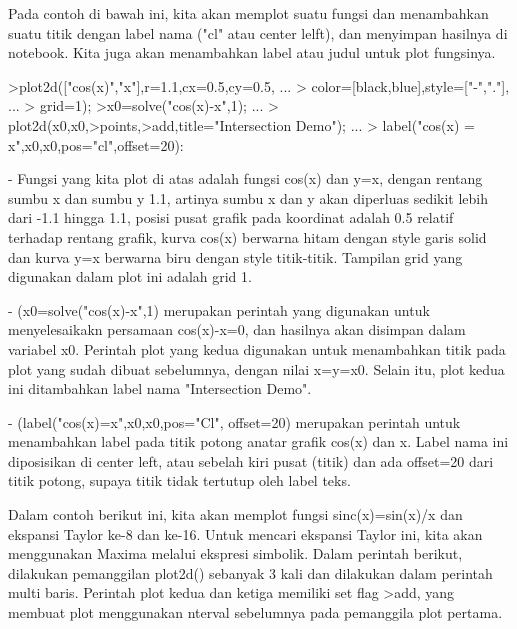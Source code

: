 \documentclass[a4paper,10pt]{article}
\begin{document}
\begin{eulernotebook}
\begin{eulercomment}
\begin{eulercomment}
\begin{eulercomment}
\begin{eulercomment}
\begin{eulercomment}
\begin{eulercomment}
\begin{eulercomment}
Pada contoh di bawah ini, kita akan memplot suatu fungsi dan
menambahkan suatu titik dengan label nama ("cl" atau center lelft),
dan menyimpan hasilnya di notebook. Kita juga akan menambahkan label
atau judul untuk plot fungsinya.
\end{eulercomment}
\begin{eulerprompt}
>plot2d(["cos(x)","x"],r=1.1,cx=0.5,cy=0.5, ...
>  color=[black,blue],style=["-","."], ...
>  grid=1);
>x0=solve("cos(x)-x",1);  ...
>  plot2d(x0,x0,>points,>add,title="Intersection Demo");  ...
>  label("cos(x) = x",x0,x0,pos="cl",offset=20):
\end{eulerprompt}
\begin{eulercomment}
- Fungsi yang kita plot di atas adalah fungsi cos(x) dan y=x, dengan
rentang sumbu x dan sumbu y 1.1, artinya sumbu x dan y akan diperluas
sedikit lebih dari -1.1 hingga 1.1, posisi pusat grafik pada koordinat
adalah 0.5 relatif terhadap rentang grafik, kurva cos(x) berwarna
hitam dengan style garis solid dan kurva y=x berwarna biru dengan
style titik-titik. Tampilan grid yang digunakan dalam plot ini adalah
grid 1.

- (x0=solve("cos(x)-x",1) merupakan perintah yang digunakan untuk
menyelesaikakn persamaan cos(x)-x=0, dan hasilnya akan disimpan dalam
variabel x0. Perintah plot yang kedua digunakan untuk menambahkan
titik pada plot yang sudah dibuat sebelumnya, dengan nilai x=y=x0.
Selain itu, plot kedua ini ditambahkan label nama "Intersection Demo".

- (label("cos(x)=x",x0,x0,pos="Cl", offset=20) merupakan perintah
untuk menambahkan label pada titik potong anatar grafik cos(x) dan x.
Label nama ini diposisikan di center left, atau sebelah kiri pusat
(titik) dan ada offset=20 dari titik potong, supaya titik tidak
tertutup oleh label teks.

Dalam contoh berikut ini, kita akan memplot fungsi sinc(x)=sin(x)/x
dan ekspansi Taylor ke-8 dan ke-16. Untuk mencari ekspansi Taylor ini,
kita akan menggunakan Maxima melalui ekspresi simbolik. Dalam perintah
berikut, dilakukan pemanggilan plot2d() sebanyak 3 kali dan dilakukan
dalam perintah multi baris. Perintah plot kedua dan ketiga memiliki
set flag \textgreater{}add, yang membuat plot menggunakan nterval sebelumnya pada
pemanggila plot pertama.


\end{eulercomment}
\end{eulercomment}
\end{eulercomment}
\end{eulercomment}
\end{eulercomment}
\end{eulercomment}
\end{eulercomment}
\end{eulernotebook}
\end{document}
